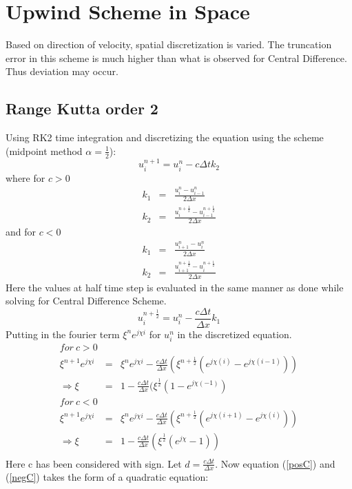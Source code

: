 \documentclass[a4paper,12pt]{report}
\begin{document}
\section{Upwind Scheme in Space}
Based on direction of velocity, spatial discretization is varied. The truncation error in this scheme is much higher than what is observed for Central Difference. Thus deviation may occur.
\subsection{Range Kutta order 2}
Using RK2 time integration and discretizing the equation using the scheme (midpoint method $\alpha = \frac{1}{2}$):
\[u^{n+1}_{i} = u^{n}_{i} - c\Delta t k_2\]
where for $c>0$
\begin{eqnarray}
k_1 &=& \frac{u_{i}^{n} -u_{i-1}^{n}}{2\Delta x} \nonumber \\
k_2 &=& \frac{u_{i}^{n+\frac{1}{2}} -u_{i-1}^{n+\frac{1}{2}}}{2\Delta x} \nonumber
\end{eqnarray}
and for $c<0$
\begin{eqnarray}
k_1 &=& \frac{u_{i+1}^{n} -u_{i}^{n}}{2\Delta x} \nonumber \\
k_2 &=& \frac{u_{i+1}^{n+\frac{1}{2}} -u_{i}^{n+\frac{1}{2}}}{2\Delta x} \nonumber
\end{eqnarray}
Here the values at half time step is evaluated in the same manner as done while solving for Central Difference Scheme.
\[u_{i}^{n+\frac{1}{2}} = u_{i}^{n} - \frac{c\Delta t}{\Delta x}k_1 \]
Putting in the fourier term $\xi^{n}e^{j\chi i}$ for $u^{n}_{i}$ in the discretized equation.
\begin{eqnarray}
for\ c>0\\
\xi^{n+1}e^{j\chi i} &=& \xi^{n}e^{j\chi i} -\frac{c\Delta t}{\Delta x}(\xi^{n+\frac{1}{2}}(e^{j\chi(i)}-e^{j\chi(i-1)})) \\
\Rightarrow \xi&=& 1 -\frac{c\Delta t}{\Delta x}(\xi^{\frac{1}{2}}(1-e^{j\chi(-1)}) \nonumber \label{posC} \\
for\ c<0\\
\xi^{n+1}e^{j\chi i} &=& \xi^{n}e^{j\chi i} -\frac{c\Delta t}{\Delta x}(\xi^{n+\frac{1}{2}}(e^{j\chi(i+1)}-e^{j\chi(i)})) \\
\Rightarrow\xi&=& 1 -\frac{c\Delta t}{\Delta x}(\xi^{\frac{1}{2}}(e^{j\chi}-1)) \nonumber\label{negC} \\
\end{eqnarray}
Here c has been considered with sign. Let $d=\frac{c\Delta t}{\Delta x}$. Now equation (\ref{posC}) and (\ref{negC}) takes the form of a quadratic equation:
\end{document}
